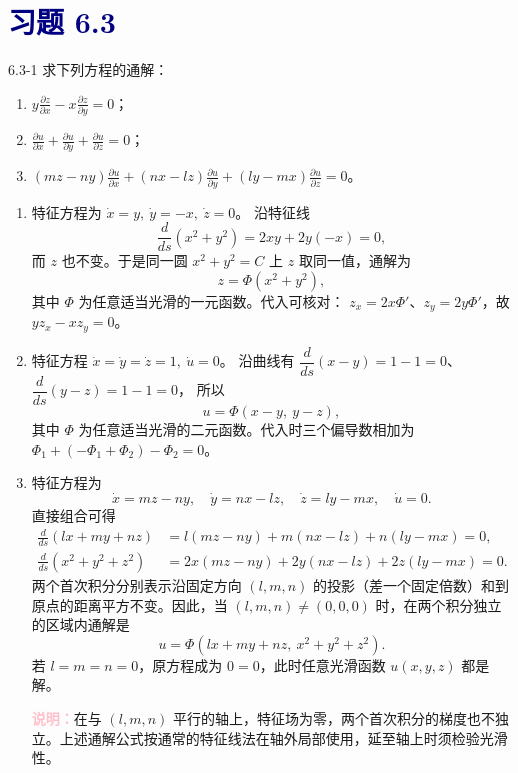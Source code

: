 \documentclass[UTF8,a4paper,11pt]{ctexart}
\newcommand{\note}[1]{\par\smallskip\noindent\textcolor{pink}{\bfseries 说明：}#1\par\smallskip}
\newcommand{\sect}[1]{\section*{\textcolor{navy}{习题 #1}}}
\begin{document}
\sect{6.3}

\begin{problem}{6.3-1}
求下列方程的通解：
\begin{enumerate}[label=(\arabic*)]
\item $\displaystyle
y\frac{\partial z}{\partial x}
-x\frac{\partial z}{\partial y}=0$；
\item $\displaystyle
\frac{\partial u}{\partial x}
+\frac{\partial u}{\partial y}
+\frac{\partial u}{\partial z}=0$；
\item $\displaystyle
(mz-ny)\frac{\partial u}{\partial x}
+(nx-lz)\frac{\partial u}{\partial y}
+(ly-mx)\frac{\partial u}{\partial z}=0$。
\end{enumerate}
\end{problem}
\begin{solution}
\begin{enumerate}[label=(\arabic*)]
\item 特征方程为
$\dot x=y,\ \dot y=-x,\ \dot z=0$。
沿特征线
\[
\frac{d}{ds}(x^2+y^2)=2xy+2y(-x)=0,
\]
而 $z$ 也不变。于是同一圆 $x^2+y^2=C$ 上 $z$ 取同一值，通解为
\[
\boxed{z=\Phi(x^2+y^2),}
\]
其中 $\Phi$ 为任意适当光滑的一元函数。代入可核对：
$z_x=2x\Phi'$、$z_y=2y\Phi'$，故 $yz_x-xz_y=0$。

\item 特征方程
$\dot x=\dot y=\dot z=1,\ \dot u=0$。
沿曲线有
$\dfrac{d}{ds}(x-y)=1-1=0$、
$\dfrac{d}{ds}(y-z)=1-1=0$，
所以
\[
\boxed{u=\Phi(x-y,\ y-z),}
\]
其中 $\Phi$ 为任意适当光滑的二元函数。代入时三个偏导数相加为
$\Phi_1+(-\Phi_1+\Phi_2)-\Phi_2=0$。

\item 特征方程为
\[
\dot x=mz-ny,\quad
\dot y=nx-lz,\quad
\dot z=ly-mx,\quad
\dot u=0.
\]
直接组合可得
\[
\begin{aligned}
\frac{d}{ds}(lx+my+nz)
&=l(mz-ny)+m(nx-lz)+n(ly-mx)=0,\\
\frac{d}{ds}(x^2+y^2+z^2)
&=2x(mz-ny)+2y(nx-lz)+2z(ly-mx)=0.
\end{aligned}
\]
两个首次积分分别表示沿固定方向 $(l,m,n)$ 的投影（差一个固定倍数）和到原点的距离平方不变。因此，当 $(l,m,n)\ne(0,0,0)$ 时，在两个积分独立的区域内通解是
\[
\boxed{u=\Phi(lx+my+nz,\ x^2+y^2+z^2).}
\]
若 $l=m=n=0$，原方程成为 $0=0$，此时任意光滑函数 $u(x,y,z)$ 都是解。
\note{在与 $(l,m,n)$ 平行的轴上，特征场为零，两个首次积分的梯度也不独立。上述通解公式按通常的特征线法在轴外局部使用，延至轴上时须检验光滑性。}
\end{enumerate}
\end{solution}
\end{document}
